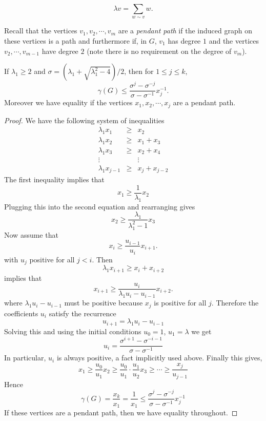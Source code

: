  \[ \lambda v = \sum_{w \sim v} w. \]




Recall that the vertices $v_1, v_2, \cdots, v_m$ are a 
\textit{pendant path} if the induced graph on these vertices
is a path and furthermore if, in $G$, $v_1$ has degree $1$ and
the vertices $v_2, \cdots, v_{m-1}$ have degree $2$
(note there is no requirement on the degree of $v_m$).

\begin{lemma}\label{path_bound}
  If $\lambda_1 \geq 2$ and $\sigma = (\lambda_1 + \sqrt{\lambda_1^2 - 4})/2$, then for
  $1 \leq j \leq k$,
   \[ \gamma(G) \leq \frac{\sigma^j - \sigma^{-j}}{\sigma - \sigma^{-1}} x_j^{-1}. \]
Moreover we have equality if the vertices $x_1, x_2, \cdots, x_{j}$ are a pendant path.
  
\end{lemma}
\begin{proof}
  We have the following system of inequalities
   \begin{eqnarray*}
     \lambda_1 x_1 & \geq & x_2 \\
     \lambda_1 x_2 & \geq & x_1 + x_3 \\
     \lambda_1 x_3 & \geq & x_2 + x_4 \\
     \vdots & & \vdots\\
     \lambda_1 x_{j-1} & \geq & x_j + x_{j-2}
   \end{eqnarray*}
 The first inequality implies that
  \[ x_1 \geq \frac{1}{\lambda_1} x_2\]
 Plugging this into the second equation and rearranging gives
  \[ x_2 \geq \frac{\lambda_1}{\lambda_1^2 - 1} x_3 \]
 Now assume that
  \[ x_i \geq \frac{u_{i-1}}{u_i} x_{i+1}. \]
 with $u_j$ positive for all $j<i$.  Then
  \[ \lambda_1 x_{i+1} \geq x_{i} + x_{i+2} \]
 implies that
  \[ x_{i+1} \geq \frac{u_i}{\lambda_1 u_i - u_{i-1}} x_{i+2}. \]
 where $\lambda_1 u_i - u_{i-1}$ must be positive because  $x_j$
 is positive for all $j$.
 Therefore the coefficients $u_i$ satisfy the recurrence
  \[ u_{i+1} = \lambda_1 u_i - u_{i-1}\]
 Solving this and using the initial conditions $u_0 = 1$,
 $u_1 = \lambda$ we get
  \[ u_i = \frac{\sigma^{i+1} - \sigma^{-i-1}}{\sigma - \sigma^{-1}} \]
 In particular, $u_i$ is always positive, a fact implicitly
 used above.  Finally this gives,
  \[ x_1 \geq \frac{u_0}{u_1} x_2 \geq \frac{u_0}{u_1} \cdot \frac{u_1}{u_2} x_3 \geq \cdots \geq \frac{x_j}{u_{j-1}} \]
 Hence
  \[ \gamma(G) = \frac{x_k}{x_1} = \frac{1}{x_1} \leq \frac{\sigma^j - \sigma^{-j}}{\sigma - \sigma^{-1}} x_j^{-1} \]
 If these vertices are a pendant path, then we have equality throughout.
\end{proof}


